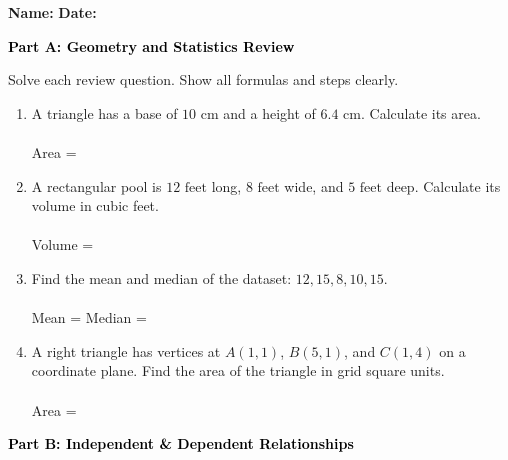 \documentclass[12pt, letterpaper, fleqn]{article}
\newcommand{\blanklong}{\underline{\hspace{6.5cm}}}
\newcommand{\blankshorter}{\underline{\hspace{1.5cm}}}
\begin{document}
\textbf{Name:} \underline{\hspace{5cm}}
\hfill
\textbf{Date:} \underline{\hspace{3cm}}\\

\begin{tcolorbox}[colback=black!10]
    \large\textcolor{black}{\textbf{Part A: Geometry and Statistics Review}}
\end{tcolorbox}

\vspace{3mm}

\noindent
Solve each review question. Show all formulas and steps clearly.

\vspace{5mm}

\begin{enumerate}[itemsep=2.0cm, leftmargin=0.6cm]
\item A triangle has a base of $10\text{ cm}$ and a height of $6.4\text{ cm}$. Calculate its area. \\ \\
Area = \blanklong

\item A rectangular pool is $12\text{ feet}$ long, $8\text{ feet}$ wide, and $5\text{ feet}$ deep. Calculate its volume in cubic feet. \\ \\
Volume = \blanklong

\item Find the mean and median of the dataset: $12, 15, 8, 10, 15$. \\ \\
Mean = \blankshorter \quad Median = \blankshorter

\item A right triangle has vertices at $A(1, 1)$, $B(5, 1)$, and $C(1, 4)$ on a coordinate plane. Find the area of the triangle in grid square units. \\ \\
Area = \blanklong
\end{enumerate}

\newpage

\begin{tcolorbox}[colback=black!10]
    \large\textcolor{black}{\textbf{Part B: Independent \& Dependent Relationships}}
\end{tcolorbox}
\end{document}
